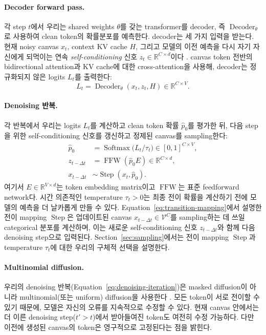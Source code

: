 \documentclass[11pt, a4paper, logo, copyright, gdm]{google}
\newcommand{\dec}{\operatorname{Decoder}_{\theta}}
\newcommand{\softmax}{\operatorname{Softmax}}
\newcommand{\Vcal}{\mathcal{V}}
\newcommand{\step}{\operatorname{Step}}
\begin{document}
\paragraph{Decoder forward pass.} 각 step $t$에서 우리는 shared weights $\theta$를 갖는 transformer를 decoder, 즉 $\dec$로 사용하여 clean token의 확률분포를 예측한다. decoder는 세 가지 입력을 받는다. 현재 noisy canvas $x_t$, context KV cache $H$, 그리고 모델의 이전 예측을 다시 자기 자신에게 되먹이는 연속 \textit{self-conditioning} 신호 $z_t \in \mathbb{R}^{C \times d}$이다 \citep{chen2023analog, strudel2022self, jo2026loopholing}. canvas token 전반의 bidirectional attention과 KV cache에 대한 cross-attention을 사용해, decoder는 정규화되지 않은 logits $L_t$를 출력한다:
\begin{equation} \label{eq:denoising-forward-pass}
    L_t = \dec(x_t, z_t, H) \in \mathbb{R}^{C \times V}.
\end{equation}

\paragraph{Denoising 반복.} 각 반복에서 우리는 logits $L_t$를 계산하고 clean token 확률 $\hat{p}_0$를 평가한 뒤, 다음 step을 위한 self-conditioning 신호를 갱신하고 정제된 canvas를 sampling한다:
\begin{equation} \label{eq:denoising-iteration}
\begin{aligned} 
    \hat{p}_0 &= \softmax \big(L_t/\tau_t\big) \in [0, 1]^{C \times V}, \\
    z_{t-\Delta t} &= \operatorname{FFW}(\hat{p}_0 E) \in \mathbb{R}^{C \times d},
    \\
    x_{t-\Delta t} &\sim \operatorname{Step}(x_t, \hat{p}_0).
\end{aligned}
\end{equation}
여기서 $E \in \mathbb{R}^{V \times d}$는 token embedding matrix이고 $\operatorname{FFW}$는 표준 feedforward network다. 시간 의존적인 temperature $\tau_t > 0$는 최종 전이 확률을 계산하기 전에 모델의 예측을 더 날카롭게 만들 수 있다. Equation~\eqref{eq:transition-mapping}에서 설명한 전이 mapping $\step$은 업데이트된 canvas $x_{t-\Delta t}  \in \Vcal^C$를 sampling하는 데 쓰일 categorical 분포를 계산하며, 이는 새로운 self-conditioning 신호 $z_{t-\Delta t}$와 함께 다음 denoising step으로 입력된다.
Section~\ref{sec:sampling}에서는 전이 mapping $\step$과 temperature $\tau_t$에 대한 우리의 구체적 선택을 설명한다.


\paragraph{Multinomial diffusion.} 우리의 denoising 반복(Equation~\ref{eq:denoising-iteration})은 masked diffusion이 아니라 multinomial(또는 uniform) diffusion을 사용한다 \citep{hoogeboom2021argmax, austin2021structured}. 모든 token이 서로 전이할 수 있기 때문에, 모델은 자신의 오류를 지속적으로 수정할 수 있다. 현재 canvas 안에서는 더 이른 denoising step($t' > t$)에서 받아들여진 token도 여전히 수정 가능하다. 다만 이전에 생성된 canvas의 token은 영구적으로 고정된다는 점을 밝힌다.
\end{document}
